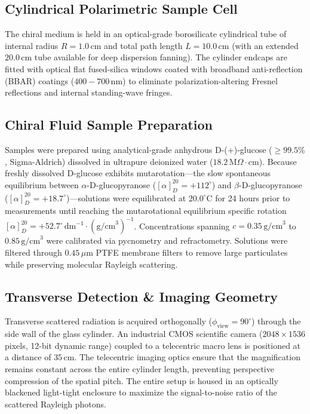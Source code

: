 \documentclass[twocolumn,10pt,a4paper]{article}
\begin{document}
\subsection{Cylindrical Polarimetric Sample Cell}
The chiral medium is held in an optical-grade borosilicate cylindrical tube of internal radius $R = 1.0\,\text{cm}$ and total path length $L = 10.0\,\text{cm}$ (with an extended $20.0\,\text{cm}$ tube available for deep dispersion fanning). The cylinder endcaps are fitted with optical flat fused-silica windows coated with broadband anti-reflection (BBAR) coatings ($400-700\,\text{nm}$) to eliminate polarization-altering Fresnel reflections and internal standing-wave fringes.

\subsection{Chiral Fluid Sample Preparation}
Samples were prepared using analytical-grade anhydrous D-(+)-glucose ($\ge 99.5\%$, Sigma-Aldrich) dissolved in ultrapure deionized water ($18.2\,\text{M}\Omega\cdot\text{cm}$). Because freshly dissolved D-glucose exhibits mutarotation—the slow spontaneous equilibrium between $\alpha$-D-glucopyranose ($[\alpha]_D^{20} = +112^\circ$) and $\beta$-D-glucopyranose ($[\alpha]_D^{20} = +18.7^\circ$)—solutions were equilibrated at $20.0^\circ\text{C}$ for 24 hours prior to measurements until reaching the mutarotational equilibrium specific rotation $[\alpha]_D^{20} = +52.7^\circ\,\text{dm}^{-1}\cdot(\text{g/cm}^3)^{-1}$. Concentrations spanning $c = 0.35\,\text{g/cm}^3$ to $0.85\,\text{g/cm}^3$ were calibrated via pycnometry and refractometry. Solutions were filtered through $0.45\,\mu\text{m}$ PTFE membrane filters to remove large particulates while preserving molecular Rayleigh scattering.

\subsection{Transverse Detection \& Imaging Geometry}
Transverse scattered radiation is acquired orthogonally ($\phi_{\text{view}} = 90^\circ$) through the side wall of the glass cylinder. An industrial CMOS scientific camera ($2048 \times 1536$ pixels, 12-bit dynamic range) coupled to a telecentric macro lens is positioned at a distance of $35\,\text{cm}$. The telecentric imaging optics ensure that the magnification remains constant across the entire cylinder length, preventing perspective compression of the spatial pitch. The entire setup is housed in an optically blackened light-tight enclosure to maximize the signal-to-noise ratio of the scattered Rayleigh photons.
\end{document}
